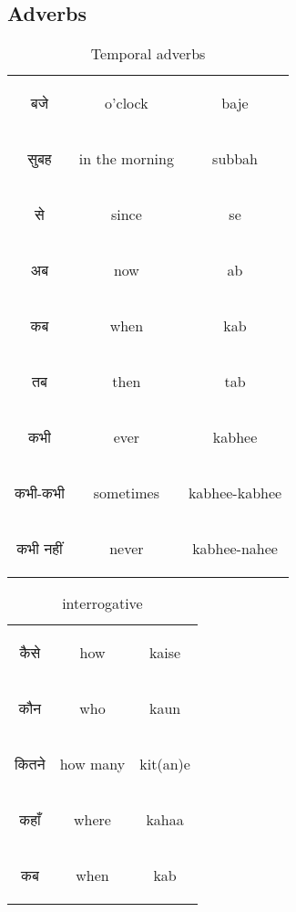 \newpage
\subsection{Adverbs}

\begin{table}[H]
    \centering
    \begin{tabular}{c|c|c}
\begin{hindi} बजे \end{hindi} & o'clock & baje \\  
\begin{hindi} सुबह \end{hindi} & in the morning & subbah \\  
\begin{hindi} से \end{hindi} & since & se \\  
\begin{hindi} अब \end{hindi} & now & ab \\  
\begin{hindi} कब \end{hindi} & when & kab \\  
\begin{hindi} तब \end{hindi} & then & tab \\  
\begin{hindi} कभी \end{hindi} & ever & kabhee \\  
\begin{hindi} कभी-कभी \end{hindi} & sometimes & kabhee-kabhee \\  
\begin{hindi} कभी नहीं\end{hindi} & never & kabhee-nahee \\  
    \end{tabular}
    \caption{Temporal adverbs}
    \label{tab:adverbs_temporal}
\end{table}


\begin{table}[H]
    \centering
    \begin{tabular}{c|c|c}        
    \begin{hindi} कैसे \end{hindi} & how & kaise \\
    \begin{hindi} कौन \end{hindi} & who & kaun \\
    \begin{hindi} कितने \end{hindi} & how many & kit(an)e \\
    \begin{hindi} कहाँ \end{hindi} & where & kahaa \\
    \begin{hindi} कब \end{hindi} & when & kab \\
    \end{tabular}    
    \caption{interrogative}
    \label{tab:adverbs_interrogative}
\end{table}

